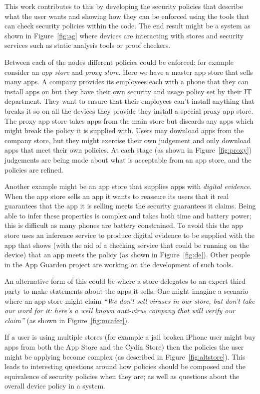 \documentclass[a4paper,sfsidenotes]{tufte-book}
\begin{document}
This work contributes to this by developing the security policies that describe
what the user wants and showing how they can be enforced using the tools that
can check security policies within the code.  The end result might be a system
as shown in Figure~\ref{fig:ag} where devices are interacting with stores and
security services such as static analysis tools or proof checkers. 

Between each of the nodes different policies could be enforced: for example
consider an \emph{app store} and \emph{proxy store}.  Here we have a master app
store that sells many apps.  A company provides its employees each
with a phone that they can install apps on but they have their own security
and usage policy set by their IT department.  They want to ensure that their
employees can't install anything that breaks it so on all the devices they
provide they install a special proxy app store.  The proxy app store takes apps
from the main store but discards any apps which might break the policy it is
supplied with.  Users may download apps from the company store, but they might
exercise their own judgement and only download apps that meet their own
policies.  At each stage (as shown in Figure~\ref{fig:proxy})
judgements are being made about what is acceptable from an app store, and the
policies are refined.

Another example might be an app store that supplies apps with \emph{digital
evidence}.  When the app store sells an app it wants to reassure its users that
it real guarantees that the app it is selling meets the security guarantees it
claims.  Being able to infer these properties is complex and takes both time and
battery power; this is difficult as many phones are battery constrained.  To
avoid this the app store uses an inference service to produce digital evidence
to be supplied with the app that shows (with the aid of a checking service that
could be running on the device) that an app meets the policy (as shown in
Figure~\ref{fig:de}). Other people in the App Guarden project are working on the
development of such tools.

An alternative form of this could be where a store delegates to an expert third
party to make statements about the apps it sells.  One might imagine a scenario
where an app store might claim \emph{``We don't sell viruses in our store, but
don't take our word for it: here's a well known anti-virus company that will
verify our claim''} (as shown in Figure~\ref{fig:mcafee}).

If a user is using multiple stores (for example a jail broken iPhone user might
buy apps from both the App Store and the Cydia Store) then the policies the user
might be applying become complex (as described in Figure~\ref{fig:altstore}).
This leads to interesting questions around how policies should be composed and
the equivalence of security policies when they are; as well as questions about
the overall device policy in a system.
\end{document}
